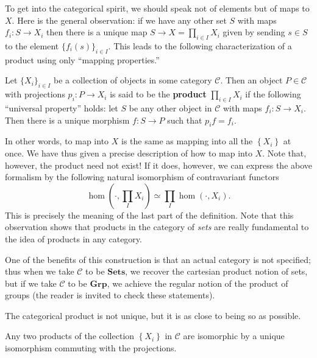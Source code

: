 To get into the categorical spirit, we should speak not of elements but of maps
to $X$. Here is the general observation: if we have any other set $S$ with maps
$f_i:S\rightarrow X_i$ then there is a unique map $S\rightarrow X=\prod_{i\in
I}X_i$ given by sending $s\in S$ to the element $\{ f_i(s)\}_{i\in I}$. This
leads to the following characterization of a product using only ``mapping
properties.''

\begin{definition} Let $\{X_i\}_{i\in I}$ be a collection of objects in some
category $\mathcal{C}$. Then an object $P \in \mathcal{C}$ with projections $p_i: P\rightarrow X_i$
is said to be the \textbf{product} $\prod_{i\in I} X_i$ if the following ``universal
property'' holds:
let $S$ be any other object in $\mathcal{C}$ with maps $f_i:S\rightarrow X_i$.
Then there is a unique morphism $f:S\rightarrow P$ such that $p_i f = f_i$.
\end{definition}

In other words, to map into $X$ is the same as mapping into all the
$\left\{X_i\right\}$ at once. We have thus given a precise description of how
to map into $X$.
Note that, however, the product need not exist! 
If it does, however, we can express the above formalism by the following
natural isomorphism
of contravariant functors
\[ \hom(\cdot, \prod_I X_i) \simeq \prod_I \hom(\cdot, X_i).  \]
This is precisely the meaning of the last part of the definition. Note that
this observation shows that products in the category of \emph{sets} are really
fundamental to the idea of products in any category.

\begin{example} One of the benefits of this construction is that an actual
category is not specified; thus when we take $\mathcal{C}$ to be
$\mathbf{Sets}$, we
recover the cartesian product notion of sets, but if we take $\mathcal{C}$ to
be $\mathbf{Grp}$, we achieve the regular notion of the product of groups (the reader is
invited to check these statements). \end{example}

The categorical product is not unique, but it is as close to being so as
possible.

\begin{proposition}\label{produnique}
Any two products of the collection $\left\{X_i\right\}$ in $\mathcal{C}$ are
isomorphic by a unique isomorphism commuting with the projections.
\end{proposition} 

